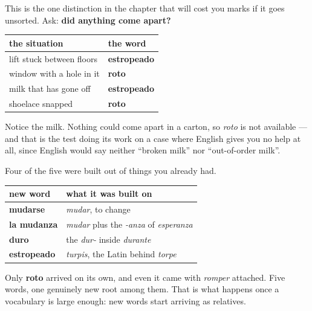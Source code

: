\begin{grammarlens}[title={Grammar Lens: two words for broken, one question}]
This is the one distinction in the chapter that will cost you marks if it goes unsorted. Ask: \textbf{did anything come apart?}

\noindent
\begin{tabularx}{\linewidth}{@{}>{\raggedright\arraybackslash}X>{\raggedright\arraybackslash}X@{}}
\toprule
\textbf{the situation} & \textbf{the word} \\
\midrule
lift stuck between floors & \textbf{estropeado} \\
window with a hole in it & \textbf{roto} \\
milk that has gone off & \textbf{estropeado} \\
shoelace snapped & \textbf{roto} \\
\bottomrule
\end{tabularx}

Notice the milk. Nothing could come apart in a carton, so \emph{roto} is not available — and that is the test doing its work on a case where English gives you no help at all, since English would say neither \textquotedblleft{}broken milk\textquotedblright{} nor \textquotedblleft{}out-of-order milk\textquotedblright{}.
\end{grammarlens}

\begin{grammarlens}[title={Grammar Lens: where the five came from}]
Four of the five were built out of things you already had.

\noindent
\begin{tabularx}{\linewidth}{@{}>{\raggedright\arraybackslash}X>{\raggedright\arraybackslash}X@{}}
\toprule
\textbf{new word} & \textbf{what it was built on} \\
\midrule
\textbf{mudarse} & \emph{mudar}, to change \\
\textbf{la mudanza} & \emph{mudar} plus the \emph{-anza} of \emph{esperanza} \\
\textbf{duro} & the \emph{dur-} inside \emph{durante} \\
\textbf{estropeado} & \emph{turpis}, the Latin behind \emph{torpe} \\
\bottomrule
\end{tabularx}

Only \textbf{roto} arrived on its own, and even it came with \emph{romper} attached. Five words, one genuinely new root among them. That is what happens once a vocabulary is large enough: new words start arriving as relatives.
\end{grammarlens}


